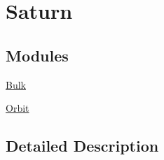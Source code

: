 \hypertarget{group___e_g_x_phys-_constants-_astrophysics-_solar_system-_saturn}{}\section{Saturn}
\label{group___e_g_x_phys-_constants-_astrophysics-_solar_system-_saturn}
\subsection*{Modules}
\begin{DoxyCompactItemize}
\item 
\mbox{\hyperlink{group___e_g_x_phys-_constants-_astrophysics-_solar_system-_saturn-_bulk}{Bulk}}
\item 
\mbox{\hyperlink{group___e_g_x_phys-_constants-_astrophysics-_solar_system-_saturn-_orbit}{Orbit}}
\end{DoxyCompactItemize}


\subsection{Detailed Description}
